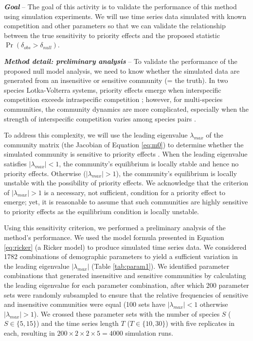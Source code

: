 \documentclass[12pt, class=article, crop=false]{standalone}
\begin{document}
\textbf{\textit{Goal}} -- 
The goal of this activity is to validate the performance of this method using simulation experiments.
We will use time series data simulated with known competition and other parameters so that we can validate the relationship between the true sensitivity to priority effects and the proposed statistic $\Pr(\delta_{obs} > \delta_{null})$.

\textbf{\textit{Method detail: preliminary analysis}} -- 
To validate the performance of the proposed null model analysis, we need to know whether the simulated data are generated from an insensitive or sensitive community (= the truth).
In two species Lotka-Volterra systems, priority effects emerge when interspecific competition exceeds intraspecific competition \citep{ke_coexistence_2018}; however, for multi-species communities, the community dynamics are more complicated, especially when the strength of interspecific competition varies among species pairs \citep{barabas_chessons_2018}.

To address this complexity, we will use the leading eigenvalue $\lambda_{max}$ of the community matrix (the Jacobian of Equation \ref{eq:m0}) to determine whether the simulated community is sensitive to priority effects \citep{otto_biologists_2011}.
When the leading eigenvalue satisfies $|\lambda_{max}| < 1$, the community's equilibrium is locally stable and hence no priority effects.
Otherwise ($|\lambda_{max}| > 1$), the community's equilibrium is locally unstable with the possibility of priority effects.
We acknowledge that the criterion of $|\lambda_{max}| > 1$ is a necessary, not sufficient, condition for a priority effect to emerge; yet, it is reasonable to assume that such communities are highly sensitive to priority effects as the equilibrium condition is locally unstable. 

Using this sensitivity criterion, we performed a preliminary analysis of the method's performance.
We used the model formula presented in Equation \ref{eq:ricker} (a Ricker model) to produce simulated time series data.
We considered 1782 combinations of demographic parameters to yield a sufficient variation in the leading eigenvalue $|\lambda_{max}|$ (Table \ref{tab:param1}).
We identified parameter combinations that generated insensitive and sensitive communities by calculating the leading eigenvalue for each parameter combination, after which 200 parameter sets were randomly subsampled to ensure that the relative frequencies of sensitive and insensitive communities were equal (100 sets have $|\lambda_{max}| < 1$ otherwise $|\lambda_{max}| > 1$).
We crossed these parameter sets with the number of species $S$ ($S \in \{5, 15\}$) and the time series length $T$ ($T \in \{10, 30\}$) with five replicates in each, resulting in $200 \times 2 \times 2 \times 5 = 4000$ simulation runs.
\end{document}
